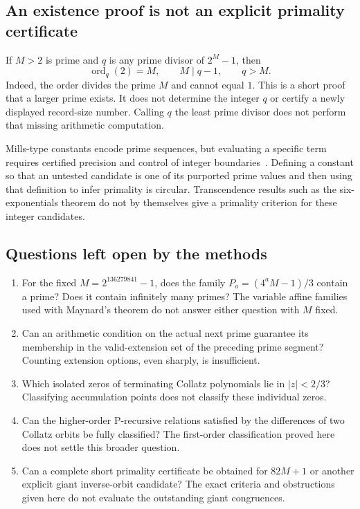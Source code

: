 \documentclass[11pt,a4paper]{article}
\theoremstyle{definition}
\theoremstyle{remark}
\numberwithin{equation}{section}
\DeclareMathOperator{\ord}{ord}
\begin{document}
\subsection{An existence proof is not an explicit primality certificate}
If $M>2$ is prime and $q$ is any prime divisor of $2^M-1$, then
\[
\ord_q(2)=M,\qquad M\mid q-1,\qquad q>M.
\]
Indeed, the order divides the prime $M$ and cannot equal $1$. This is a short
proof that a larger prime exists. It does not determine the integer $q$ or
certify a newly displayed record-size number. Calling $q$ the least prime
divisor does not perform that missing arithmetic computation.

Mills-type constants encode prime sequences, but evaluating a specific term
requires certified precision and control of integer boundaries~\cite{R015}.
Defining a constant so that an untested candidate is one of its purported prime
values and then using that definition to infer primality is circular.
Transcendence results such as the six-exponentials theorem do not by themselves
give a primality criterion for these integer candidates.

\subsection{Questions left open by the methods}
\begin{enumerate}
\item For the fixed $M=2^{136279841}-1$, does the family
$P_a=(4^aM-1)/3$ contain a prime? Does it contain infinitely many primes?
The variable affine families used with Maynard's theorem do not answer either
question with $M$ fixed.
\item Can an arithmetic condition on the actual next prime guarantee its
membership in the valid-extension set of the preceding prime segment?
Counting extension options, even sharply, is insufficient.
\item Which isolated zeros of terminating Collatz polynomials lie in
$|z|<2/3$? Classifying accumulation points does not classify these individual
zeros.
\item Can the higher-order P-recursive relations satisfied by the differences
of two Collatz orbits be fully classified? The first-order classification
proved here does not settle this broader question.
\item Can a complete short primality certificate be obtained for $82M+1$ or
another explicit giant inverse-orbit candidate? The exact criteria and
obstructions given here do not evaluate the outstanding giant congruences.
\end{enumerate}
\end{document}
